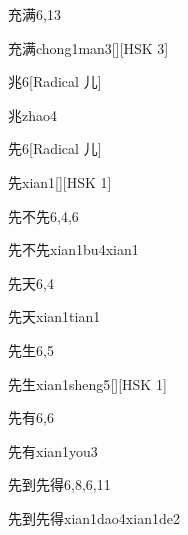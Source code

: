 \begin{entry}{充满}{6,13}
  \begin{phonetics}{充满}{chong1man3}[][HSK 3]
  \end{phonetics}
\end{entry}

\begin{entry}{兆}{6}[Radical 儿]
  \begin{phonetics}{兆}{zhao4}
  \end{phonetics}
\end{entry}

\begin{entry}{先}{6}[Radical 儿]
  \begin{phonetics}{先}{xian1}[][HSK 1]
  \end{phonetics}
\end{entry}

\begin{entry}{先不先}{6,4,6}
  \begin{phonetics}{先不先}{xian1bu4xian1}
  \end{phonetics}
\end{entry}

\begin{entry}{先天}{6,4}
  \begin{phonetics}{先天}{xian1tian1}
  \end{phonetics}
\end{entry}

\begin{entry}{先生}{6,5}
  \begin{phonetics}{先生}{xian1sheng5}[][HSK 1]
  \end{phonetics}
\end{entry}

\begin{entry}{先有}{6,6}
  \begin{phonetics}{先有}{xian1you3}
  \end{phonetics}
\end{entry}

\begin{entry}{先到先得}{6,8,6,11}
  \begin{phonetics}{先到先得}{xian1dao4xian1de2}
  \end{phonetics}
\end{entry}

